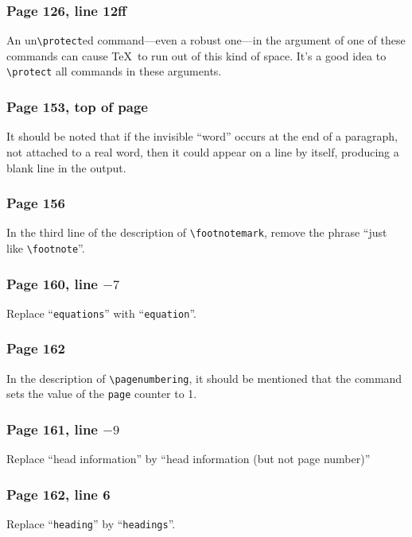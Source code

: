  
\subsubsection*{Page 126, line 12ff}
An un\verb|\protect|ed command---even a robust one---in the argument
of one of these commands can cause \TeX\ to run out of this kind of
space.  It's a good idea to \verb|\protect| all commands in
these arguments.
 
 
\subsubsection*{Page 153, top of page}
It should be noted that if the invisible ``word'' occurs at the end
of a paragraph, not attached to a real word, then it could appear
on a line by itself, producing a blank line in the output.
 
\subsubsection*{Page 156}
In the third line of the description of \verb|\footnotemark|, 
remove the phrase ``just like \verb|\footnote|''.
 
\subsubsection*{Page 160, line $-7$}
Replace ``{\tt equations}'' with ``{\tt equation}''.
 
\subsubsection*{Page 162}
 
In the description of \verb|\pagenumbering|, it should be mentioned
that the command sets the value of the {\tt page} counter to 1.
 
\subsubsection*{Page 161, line $-9$}
Replace ``head information'' by ``head information (but not
page number)''
 
\subsubsection*{Page 162, line 6}
Replace ``{\tt heading}'' by ``{\tt headings}''.
 
